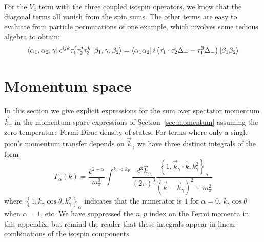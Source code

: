 For the $V_4$ term with the three coupled isospin operators, we know that the diagonal terms all vanish from the spin sums. The other terms are easy to evaluate from particle permutations of one example, which involves some tedious algebra to obtain:
\begin{equation}
\bra{ \alpha_1, \alpha_2, \gamma }\epsilon^{ijk}\tau_1^i\tau_2^j\tau_3^k \ket{\beta_1, \gamma, \beta_2}  
= \bra{\alpha_1 \alpha_2} i \left(\vec{\tau}_1\cdot\vec{\tau}_2\Delta_+-\tau_1^3\Delta_- \right) \ket{\beta_1 \beta_2}
\end{equation}


\section{\label{app:momSums}Momentum space}

In this section we give explicit expressions for the sum over spectator momentum $\vec{k}_\gamma$ in the momentum space expressions of Section~\ref{sec:momentum} assuming the zero-temperature Fermi-Dirac density of states. For terms where only a single pion's momentum transfer depends on $\vec{k}_\gamma$ we have three distinct integrals of the form 
\begin{equation}
\Gamma_{\alpha}(k) = \frac{k^{2-\alpha}}{m_\pi^3}\int^{k_\gamma<k_F}\frac{d^3\vec{k}_\gamma}{(2\pi)^3}  \frac{\left\{1,\vec{k}_\gamma\cdot\hat{k},k_\gamma^2\right\}_\alpha}{(\vec{k}-\vec{k}_\gamma)^2+m_\pi^2}
\end{equation}
where $\left\{1,k_\gamma\cos\theta,k_\gamma^2\right\}_\alpha$ indicates that the numerator is $1$ for $\alpha=0$, $k_\gamma\cos\theta$ when $\alpha=1$, etc. We have suppressed the $n,p$ index on the Fermi momenta in this appendix, but remind the reader that these integrals appear in linear combinations of the isospin components.

